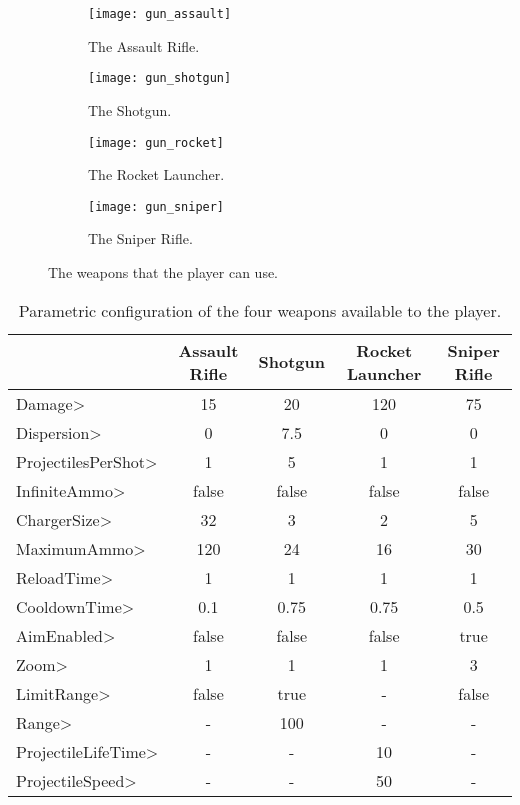 \begin{figure}[p]
\centering
\begin{subfigure}[t]{0.48\linewidth}
\texttt{[image: gun\_assault]}
\caption{The Assault Rifle.}
\label{fig:assault}
\end{subfigure}
\begin{subfigure}[t]{0.48\linewidth}
\texttt{[image: gun\_shotgun]}
\caption{The Shotgun.}
\label{fig:shotgun}
\end{subfigure}
\begin{subfigure}[t]{0.48\linewidth}
\texttt{[image: gun\_rocket]}
\caption{The Rocket Launcher.}
\label{fig:rocket}
\end{subfigure}
\begin{subfigure}[t]{0.48\linewidth}
\texttt{[image: gun\_sniper]}
\caption{The Sniper Rifle.}
\label{fig:sniper}
\end{subfigure}
\caption{The weapons that the player can use.}
\end{figure}

\begin{table}[p]
\setlength\extrarowheight{2pt}
\begin{tabularx}{\textwidth}{|l|C|C|C|C|}
& Assault Rifle & Shotgun & Rocket Launcher & Sniper Rifle  \\
\hline
\<Damage> & 15  & 20  &  120 & 75  \\
\hline
\<Dispersion> & 0  & 7.5  & 0  & 0  \\
\hline
\<ProjectilesPerShot> &  1 &  5 & 1  & 1  \\
\hline
\<InfiniteAmmo> & false & false  & false &   false\\
\hline
\<ChargerSize> & 32  & 3  &  2 &  5 \\
\hline
\<MaximumAmmo> &  120 &  24 & 16  & 30  \\
\hline
\<ReloadTime> &  1 & 1  &  1 & 1  \\
\hline
\<CooldownTime> &  0.1 &  0.75 &  0.75 &  0.5 \\
\hline
\<AimEnabled> &  false & false  & false  & true  \\
\hline
\<Zoom> & 1  &  1 &  1 & 3  \\
\hline
\<LimitRange> & false  & true  &  - & false  \\
\hline
\<Range> &  - &  100 &  - &  - \\
\hline
\<ProjectileLifeTime> & -  & -  & 10  & -  \\
\hline
\<ProjectileSpeed> &  - &  - & 50 &  - \\
\hline
\end{tabularx}
\caption{Parametric configuration of the four weapons available to the player.}
    \label{tab:gunconfig}
\end{table}

